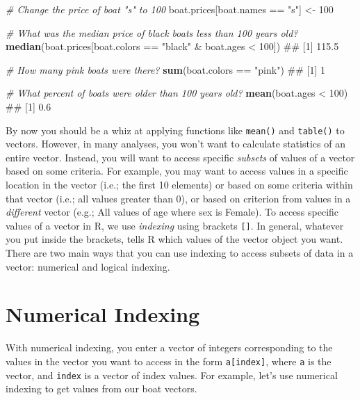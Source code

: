 \documentclass[]{book}
\newenvironment{Shaded}{\begin{snugshade}}{\end{snugshade}}
\newcommand{\KeywordTok}[1]{\textcolor[rgb]{0.13,0.29,0.53}{\textbf{{#1}}}}
\newcommand{\DecValTok}[1]{\textcolor[rgb]{0.00,0.00,0.81}{{#1}}}
\newcommand{\StringTok}[1]{\textcolor[rgb]{0.31,0.60,0.02}{{#1}}}
\newcommand{\CommentTok}[1]{\textcolor[rgb]{0.56,0.35,0.01}{\textit{{#1}}}}
\newcommand{\NormalTok}[1]{{#1}}
\theoremstyle{definition}
\theoremstyle{definition}
\theoremstyle{remark}
\begin{document}
\begin{Shaded}
\begin{Highlighting}[]
\CommentTok{# Change the price of boat "s" to 100}
\NormalTok{boat.prices[boat.names ==}\StringTok{ "s"}\NormalTok{] <-}\StringTok{ }\DecValTok{100}

\CommentTok{# What was the median price of black boats less than 100 years old?}
\KeywordTok{median}\NormalTok{(boat.prices[boat.colors ==}\StringTok{ "black"} \NormalTok{&}\StringTok{ }\NormalTok{boat.ages <}\StringTok{ }\DecValTok{100}\NormalTok{])}
\NormalTok{## [1] 115.5}

\CommentTok{# How many pink boats were there?}
\KeywordTok{sum}\NormalTok{(boat.colors ==}\StringTok{ "pink"}\NormalTok{)}
\NormalTok{## [1] 1}

\CommentTok{# What percent of boats were older than 100 years old?}
\KeywordTok{mean}\NormalTok{(boat.ages <}\StringTok{ }\DecValTok{100}\NormalTok{)}
\NormalTok{## [1] 0.6}
\end{Highlighting}
\end{Shaded}

By now you should be a whiz at applying functions like \texttt{mean()}
and \texttt{table()} to vectors. However, in many analyses, you won't
want to calculate statistics of an entire vector. Instead, you will want
to access specific \emph{subsets} of values of a vector based on some
criteria. For example, you may want to access values in a specific
location in the vector (i.e.; the first 10 elements) or based on some
criteria within that vector (i.e.; all values greater than 0), or based
on criterion from values in a \emph{different} vector (e.g.; All values
of age where sex is Female). To access specific values of a vector in R,
we use \emph{indexing} using brackets \texttt{{[}{]}}. In general,
whatever you put inside the brackets, tells R which values of the vector
object you want. There are two main ways that you can use indexing to
access subsets of data in a vector: numerical and logical indexing.

\section{Numerical Indexing}\label{numerical-indexing}

With numerical indexing, you enter a vector of integers corresponding to
the values in the vector you want to access in the form
\texttt{a{[}index{]}}, where \texttt{a} is the vector, and
\texttt{index} is a vector of index values. For example, let's use
numerical indexing to get values from our boat vectors.
\end{document}
